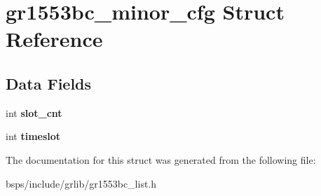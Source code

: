 \hypertarget{structgr1553bc__minor__cfg}{}\section{gr1553bc\+\_\+minor\+\_\+cfg Struct Reference}
\label{structgr1553bc__minor__cfg}
\subsection*{Data Fields}
\begin{DoxyCompactItemize}
\item 
\mbox{\label{structgr1553bc__minor__cfg_a9027d64efc5dcef3344dd73d4c065ab2}} 
int {\bfseries slot\+\_\+cnt}
\item 
\mbox{\label{structgr1553bc__minor__cfg_a172590f05ec29428c5517cea89c2b8ce}} 
int {\bfseries timeslot}
\end{DoxyCompactItemize}


The documentation for this struct was generated from the following file\+:\begin{DoxyCompactItemize}
\item 
bsps/include/grlib/gr1553bc\+\_\+list.\+h\end{DoxyCompactItemize}
